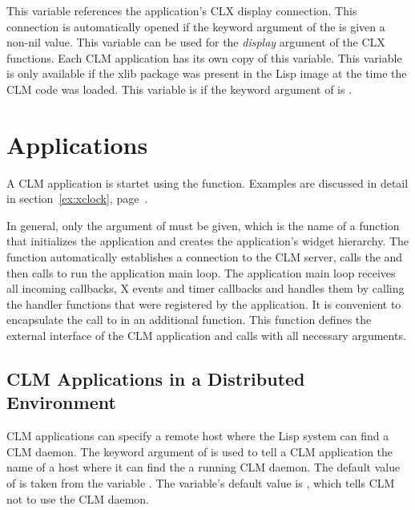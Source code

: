 \begin{lispd}
\beschr This variable references the application's CLX display connection. This
connection is automatically opened if the  keyword argument of
the  is given a non-nil value. This variable can be used for the {\em display} argument of the CLX functions. Each CLM application
has its own copy of this variable.
\hinweis This variable is only available if the {\lisp xlib} package was present
in the Lisp image at the time the CLM code was loaded. This variable is 
 if the  keyword argument of 
is .
\end{lispd}

\chapter{Applications}

A CLM application is startet using the  function. 
Examples are discussed in detail in section~\ref{ex:xclock},
page~\pageref{ex:xclock}. 

In general, only the  argument of
 must be given, which is the name of a function that
initializes the application and creates the application's widget hierarchy.  The
function  automatically establishes a connection to
the CLM server, calls the  and then calls
 to run the application main loop.  The application main
loop receives all incoming callbacks, X events and timer callbacks and handles
them by calling the handler functions that were registered by the application. 
It is convenient to encapsulate the call to  in an
additional function.  This function defines the external interface of the CLM
application and calls  with all necessary
arguments. 

\section{CLM Applications in a Distributed Environment}

CLM applications can specify a remote host where the Lisp system can find a
CLM daemon.  The keyword argument  of
 is used to tell a CLM application the name of a
host where it can find the a running CLM daemon.  The default value of
 is taken from the variable . 
The variable's default value is , which tells CLM not to use the
CLM daemon. 

